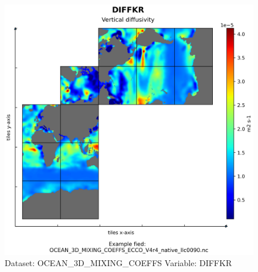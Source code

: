 \begin{figure}[H]
\centering
\includegraphics[width=\textwidth]{../images/plots/native_plots/Ocean_3D_Gent-Mcwilliams_Redi_and_Background_Vertical_Diffusivity_Coefficients_for_the_Lat-Lon-Cap_90_(llc90)_Native_Model_Grid_(Version_4_Release_4)/DIFFKR.png}
\caption{Dataset: OCEAN\_3D\_MIXING\_COEFFS Variable: DIFFKR}
\label{tab:table-OCEAN_3D_MIXING_COEFFS_DIFFKR-Plot}
\end{figure}
\pagebreak
